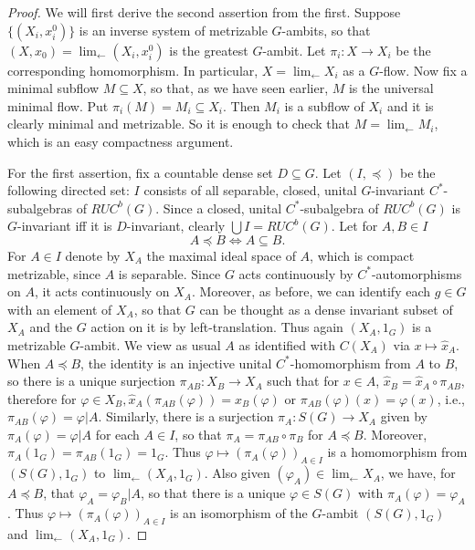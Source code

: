 \begin{proof} We will first derive the second assertion from the first.
    Suppose $\{(X_i,x^0_i)\}$ is an inverse system of metrizable $G$-ambits,
    so that $(X,x_0)=\lim_{\leftarrow}(X_i,x^0_i)$ is the greatest $G$-ambit.
    Let $\pi_i:X\rightarrow X_i$ be the corresponding homomorphism.  In
    particular, $X=\lim_{\leftarrow}X_i$ as a $G$-flow.  Now fix a minimal
    subflow $M\subseteq X$, so that, as we have seen earlier, $M$ is the
    universal minimal flow.  Put $\pi_i(M)=M_i\subseteq X_i$.  Then $M_i$ is a
    subflow of $X_i$ and it is clearly minimal and metrizable.  So it is enough
    to check that $M=\lim_{\leftarrow}M_i$, which is an easy compactness
    argument.

    For the first assertion, fix a countable dense set $D\subseteq G$.  Let
    $(I,\preceq)$ be the following directed set:  $I$ consists of all separable,
    closed, unital $G$-invariant $C^*$-subalgebras of $RUC^b(G)$.  Since a
    closed, unital $C^*$-subalgebra of $RUC^b(G)$ is $G$-invariant iff it
    is $D$-invariant, clearly $\bigcup I=RUC^b(G)$.  Let for $A,B\in I$
    \[
        A\preceq B\Leftrightarrow A\subseteq B.
    \]
    For $A\in I$ denote by $X_A$ the maximal ideal space of $A$, which is
    compact metrizable, since $A$ is separable.  Since $G$ acts continuously
    by $C^*$-automorphisms on $A$, it acts continuously on $X_A$.  Moreover,
    as before,  we can identify each $g\in G$ with an element of $X_A$, so that
    $G$ can be thought as a dense invariant subset of $X_A$ and the $G$ action
    on it is by left-translation.  Thus again $(X_A,1_G)$ is a metrizable
    $G$-ambit.  We view as usual $A$ as identified with $C(X_A)$ via $x\mapsto
        \hat x_A$.  When $A\preceq B$, the identity is an injective unital
    $C^*$-homomorphism from $A$ to $B$, so there is a unique surjection
    $\pi_{AB}:X_B\rightarrow X_A$ such that for $x\in A$, $\hat x_B=\hat x_A
        \circ\pi_{AB}$, therefore for $\varphi\in X_B, \hat x_A(\pi_{AB}(\varphi
        ))=\hat x_B(\varphi )$ or $\pi_{AB}(\varphi )(x)=\varphi (x)$, i.e.,
    $\pi_{AB}(\varphi )=\varphi |A$.  Similarly, there is a surjection
    $\pi_A:S(G)\rightarrow X_A$ given by $\pi_A(\varphi )=\varphi |A$ for
    each $A\in I$, so that $\pi_A=\pi_{AB}\circ\pi_B$ for $A\preceq B$.
    Moreover, $\pi_A (1_G)= \pi_{AB} (1_G) = 1_G$.  Thus
    $\varphi\mapsto (\pi_A(\varphi))_{A\in I}$
    is a homomorphism from $(S(G),1_G)$ to $\lim_{\leftarrow}(X_A,1_G)$.
    Also given $(\varphi_A)\in\lim_{\leftarrow}X_A$, we have, for
    $A\preceq B$, that $\varphi_A=\varphi_B|A$, so that there is a unique
    $\varphi\in S(G)$ with $\pi_A(\varphi )=\varphi_A$.  Thus $\varphi\mapsto
        (\pi_A(\varphi ))_{A\in I}$ is an isomorphism of the $G$-ambit
    $(S(G),1_G)$ and $\lim_{\leftarrow} (X_A,1_G)$.
\end{proof}


